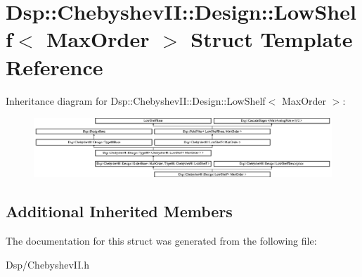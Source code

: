 \hypertarget{structDsp_1_1ChebyshevII_1_1Design_1_1LowShelf}{\section{Dsp\-:\-:Chebyshev\-I\-I\-:\-:Design\-:\-:Low\-Shelf$<$ Max\-Order $>$ Struct Template Reference}
\label{structDsp_1_1ChebyshevII_1_1Design_1_1LowShelf}
}
Inheritance diagram for Dsp\-:\-:Chebyshev\-I\-I\-:\-:Design\-:\-:Low\-Shelf$<$ Max\-Order $>$\-:\begin{figure}[H]
\begin{center}
\leavevmode
\includegraphics[height=2.258065cm]{structDsp_1_1ChebyshevII_1_1Design_1_1LowShelf}
\end{center}
\end{figure}
\subsection*{Additional Inherited Members}


The documentation for this struct was generated from the following file\-:\begin{DoxyCompactItemize}
\item 
Dsp/Chebyshev\-I\-I.\-h\end{DoxyCompactItemize}
